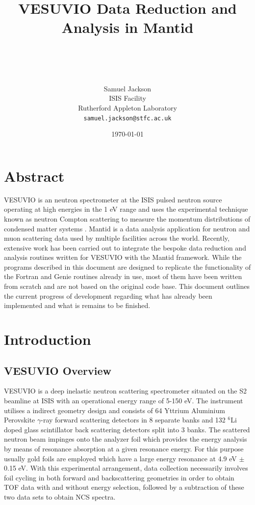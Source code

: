 \documentclass[paper=a4, fontsize=11pt]{scrartcl}	%
\title{ \vspace{-1in} 	\usefont{OT1}{bch}{b}{n}
		\huge \strut VESUVIO Data Reduction and Analysis in Mantid \strut \\
}
\author{ 									\usefont{OT1}{bch}{m}{n}
        Samuel Jackson\\		\usefont{OT1}{bch}{m}{n}
        ISIS Facility\\	\usefont{OT1}{bch}{m}{n}
        Rutherford Appleton Laboratory\\
        \texttt{samuel.jackson@stfc.ac.uk}
}
\date{\today}
\numberwithin{equation}{section}															%
\numberwithin{figure}{section}																%
\numberwithin{table}{section}
\begin{document}
\maketitle
\clearpage
\tableofcontents
\clearpage

\section{Abstract}
VESUVIO is an neutron spectrometer at the ISIS pulsed neutron source operating at high energies in the 1 eV range and uses the experimental technique known as neutron Compton scattering to measure the momentum distributions of condensed matter systems \citep{mayers2012vesuvio}. Mantid \citep{mantid} is a data analysis application for neutron and muon scattering data used by multiple facilities across the world. Recently, extensive work has been carried out to integrate the bespoke data reduction and analysis routines written for VESUVIO with the Mantid framework. While the programs described in this document are designed to replicate the functionality of the Fortran and Genie routines already in use, most of them have been written from scratch and are not based on the original code base. This document outlines the current progress of development regarding what has already been implemented and what is remains to be finished.

\clearpage
\section{Introduction}
\label{sec:introduction}
\subsection{VESUVIO Overview}
\label{subsec:VESUVIO-overview}
VESUVIO is a deep inelastic neutron scattering spectrometer situated on the S2 beamline at ISIS with an operational energy range of 5-150 eV. The instrument utilises a indirect geometry design and consists of 64 Yttrium Aluminium Perovskite $\gamma$-ray forward scattering detectors in 8 separate banks and 132 $^6$Li doped glass scintillator back scattering detectors split into 3 banks. The scattered neutron beam impinges onto the analyzer foil which provides the energy analysis by means of resonance absorption at a given resonance energy. For this purpose usually gold foils are employed which have a large energy resonance at 4.9 eV $\pm$ 0.15 eV. With this experimental arrangement, data collection necessarily involves foil cycling in both forward and backscattering geometries in order to obtain TOF data with and without energy selection, followed by a subtraction of these two data sets to obtain NCS spectra. 
\end{document}
